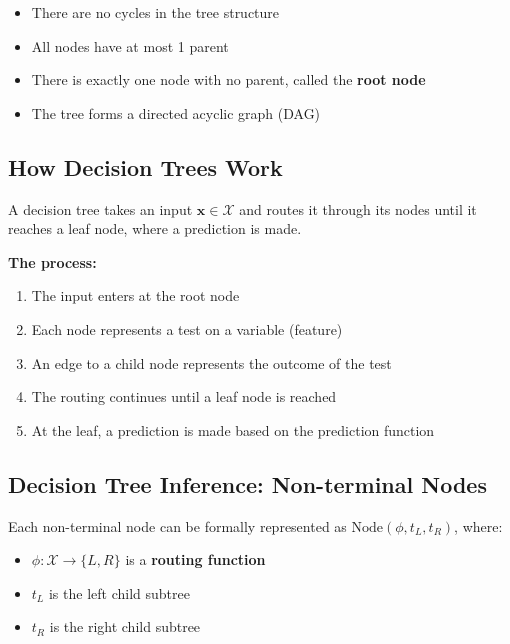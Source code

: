 \documentclass[11pt,a4paper]{article}
\theoremstyle{definition}
\theoremstyle{plain}
\theoremstyle{remark}
\begin{document}
\begin{tcolorbox}[colback=blue!5!white,colframe=blue!75!black,title=\textbf{Key Structural Properties}]
\begin{itemize}
    \item There are no cycles in the tree structure
    \item All nodes have at most 1 parent
    \item There is exactly one node with no parent, called the \textbf{root node}
    \item The tree forms a directed acyclic graph (DAG)
\end{itemize}
\end{tcolorbox}

\subsection{How Decision Trees Work}

A decision tree takes an input \(\mathbf{x} \in \mathcal{X}\) and routes it through its nodes until it reaches a leaf node, where a prediction is made.

\textbf{The process:}
\begin{enumerate}
    \item The input enters at the root node
    \item Each node represents a test on a variable (feature)
    \item An edge to a child node represents the outcome of the test
    \item The routing continues until a leaf node is reached
    \item At the leaf, a prediction is made based on the prediction function
\end{enumerate}

\subsection{Decision Tree Inference: Non-terminal Nodes}

Each non-terminal node can be formally represented as \(\text{Node}(\phi, t_L, t_R)\), where:

\begin{itemize}
    \item \(\phi: \mathcal{X} \rightarrow \{L, R\}\) is a \textbf{routing function}
    \item \(t_L\) is the left child subtree
    \item \(t_R\) is the right child subtree
\end{itemize}
\end{document}
